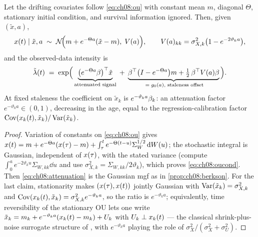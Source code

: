 \begin{proposition}
\label{prop:ch08:attenuation}
Let the drifting covariates follow \cref{eq:ch08:ou} with constant mean
$m$, diagonal $\Theta$, stationary initial condition, and survival
information ignored. Then, given $(\tilde x, a)$,
\begin{equation}\label{eq:ch08:oucond}
x(t) \mid \tilde x, a
 \;\sim\;
 \mathcal{N}\!\Big(m + e^{-\Theta a}(\tilde x - m),\; V(a)\Big),
\qquad
V(a)_{kk} = \sigma_{X,k}^2\big(1 - e^{-2\vartheta_k a}\big),
\end{equation}
and the observed-data intensity is
\begin{equation}\label{eq:ch08:attenuation}
\tilde{\lambda}(t)
 \;=\;
 \exp\!\Big(
 \underbrace{\big(e^{-\Theta a}\beta\big)^{\top} \tilde x}_{\text{attenuated
 signal}}
 \;+\;
 \underbrace{\beta^{\top}\big(I - e^{-\Theta a}\big)m
 + \tfrac12\,\beta^{\top} V(a)\beta}_{\;=\;g_0(a)\text{, staleness offset}}
 \Big).
\end{equation}
At fixed staleness the coefficient on $\tilde x_k$ is
$e^{-\vartheta_k a}\beta_k$: an attenuation factor $e^{-\vartheta_k a}
\in (0,1)$, decreasing in the age, equal to the regression-calibration
factor $\operatorname{Cov}(x_k(t), \tilde x_k)/\operatorname{Var}(\tilde x_k)$.
\end{proposition}

\begin{proof}
Variation of constants on \cref{eq:ch08:ou} gives $x(t) = m +
e^{-\Theta a}(x(\tau) - m) + \int_\tau^t e^{-\Theta(t-u)}
\Sigma_W^{1/2}\,\mathrm{d} W(u)$; the stochastic integral is Gaussian,
independent of $x(\tau)$, with the stated variance (compute
$\int_0^a e^{-2\vartheta_k u}\Sigma_{W,kk}\dd u$ and use
$\sigma^2_{X,k} = \Sigma_{W,kk}/2\vartheta_k$), which proves
\cref{eq:ch08:oucond}. Then \cref{eq:ch08:attenuation} is the Gaussian
mgf as in \cref{prop:ch08:berkson}. For the last claim, stationarity
makes $(x(\tau),x(t))$ jointly Gaussian with
$\operatorname{Var}(\tilde x_k) = \sigma_{X,k}^2$ and $\operatorname{Cov}(x_k(t),\tilde x_k) =
\sigma_{X,k}^2 e^{-\vartheta_k a}$, so the ratio is $e^{-\vartheta_k a}$;
equivalently, time reversibility of the stationary OU lets one write
$\tilde x_k = m_k + e^{-\vartheta_k a}(x_k(t) - m_k) + U_k$ with
$U_k \perp x_k(t)$ --- the classical shrink-plus-noise surrogate
structure of \citet{prentice1982}, with $e^{-\vartheta_k a}$ playing the
role of $\sigma_X^2/(\sigma_X^2 + \sigma_U^2)$.
\end{proof}

